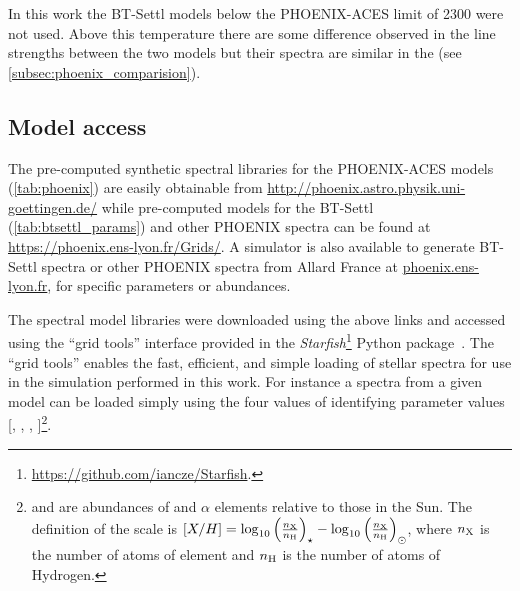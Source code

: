 

In this work the {BT-Settl} models below the {PHOENIX-ACES} limit of 2300\K{} were not used.
Above this temperature there are some difference observed in the line strengths between the two models but their spectra are similar in the \nir{} (see \cref{subsec:phoenix_comparision}).


\subsection{Model access}
\label{subsec:model_access}
The pre-computed synthetic spectral libraries for the {PHOENIX-ACES} models (\cref{tab:phoenix}) are easily obtainable from \href{http://phoenix.astro.physik.uni-goettingen.de/}{\url{http://phoenix.astro.physik.uni-goettingen.de/}} while pre-computed models for the {BT-Settl} (\cref{tab:btsettl_params}) and other {PHOENIX} spectra can be found at \href{https://phoenix.ens-lyon.fr/Grids/}{\url{https://phoenix.ens-lyon.fr/Grids/}}.
A simulator is also available to generate {BT-Settl} spectra or other {PHOENIX} spectra from {Allard France} at \href{phoenix.ens-lyon.fr}{\url{phoenix.ens-lyon.fr}}, for specific parameters or abundances.

The spectral model libraries were downloaded using the above links and accessed using the ``grid tools'' interface provided in the \emph{Starfish}\footnote{\href{https://github.com/iancze/Starfish}{\url{https://github.com/iancze/Starfish}}.} Python package~\citep{czekala_constructing_2015}.
The ``grid tools'' enables the fast, efficient, and simple loading of stellar spectra for use in the simulation performed in this work.
For instance a spectra from a given model can be loaded simply using the four values of identifying parameter values [\Teff{}, \Logg{}, \feh{}, \alphafe{}]\footnote{\feh{} and \alphafe{} are abundances of  and \(\alpha\) elements relative to those in the Sun.
    The definition of the scale is \([X/H] = \log_{10}{\left(\frac{n_{\ce{X}}}{n_{\ce{H}}}\right)}_{\star} - \log_{10}{\left(\frac{n_{\ce{X}}}{n_{\ce{H}}}\right)}_{\odot}\), where $n_{\ce{X}}$ is the number of atoms of element  and $n_{\ce{H}}$ is the number of atoms of Hydrogen.}.



